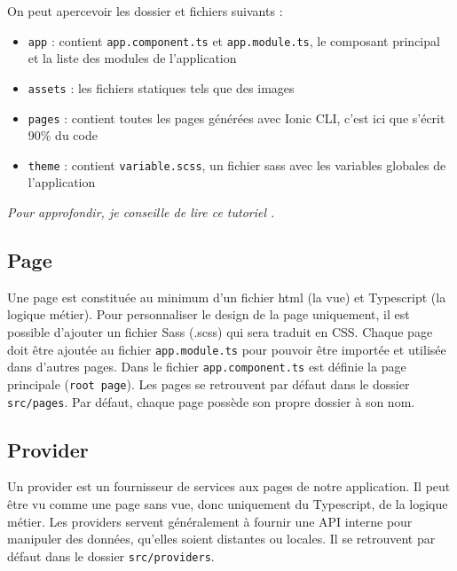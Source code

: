 \documentclass[a4paper, 12pt]{article}
\begin{document}
On peut apercevoir les dossier et fichiers suivants :
\begin{itemize}
    \item \texttt{app} : contient \texttt{app.component.ts} et \texttt{app.module.ts}, le composant principal et la liste des modules de l'application
    \item \texttt{assets} : les fichiers statiques tels que des images
    \item \texttt{pages} : contient toutes les pages générées avec Ionic CLI, c'est ici que s'écrit 90\% du code
    \item \texttt{theme} : contient \texttt{variable.scss}, un fichier sass avec les variables globales de l'application
\end{itemize}
\textit{Pour approfondir, je conseille de lire ce tutoriel \cite{ref20}.}

\subsection{Page}
Une page est constituée au minimum d'un fichier html (la vue) et Typescript (la logique métier). Pour personnaliser le
design de la page uniquement, il est possible d'ajouter un fichier Sass (.scss) qui sera traduit en CSS. Chaque page doit être
ajoutée au fichier \texttt{app.module.ts} pour pouvoir être importée et utilisée dans d'autres pages. Dans le fichier
\texttt{app.component.ts} est définie la page principale (\texttt{root page}). Les pages se retrouvent
par défaut dans le dossier \texttt{src/pages}. Par défaut, chaque page possède son propre dossier à son nom.

\subsection{Provider}
Un provider est un fournisseur de services aux pages de notre application. Il peut être vu comme une page sans vue, donc
uniquement du Typescript, de la logique métier. Les providers servent généralement à fournir une API interne pour
manipuler des données, qu'elles soient distantes ou locales. Il se retrouvent par défaut dans le dossier
\texttt{src/providers}.
\end{document}
